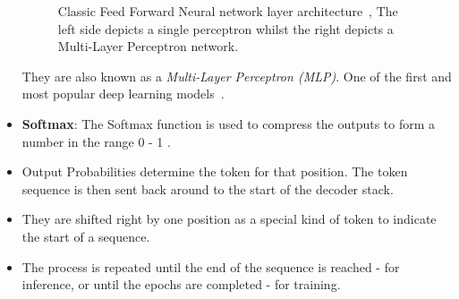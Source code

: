 \begin{itemize}
\begin{figure}[H]
		      \label{fig:feed_forward}
		      \caption{Classic Feed Forward Neural network layer architecture~\autocite{guptaDeepLearningFeedforward2018}, The left side depicts
			      a single perceptron whilst the right depicts a Multi-Layer Perceptron network.}
	      \end{figure}
	      They are also known as a \emph{Multi-Layer Perceptron (MLP)}. One of the first and most popular deep learning models~\autocite{FeedforwardNeuralNetwork2022}.
	\item \textbf{Softmax}: The Softmax function is used to compress the outputs to form a number in the range 0 - 1 .
	\item Output Probabilities determine the token for that position. The token sequence is then sent back around to the start of the decoder stack.
	\item They are shifted right by one position as a special kind of token to indicate the start of a sequence.
	\item The process is repeated until the end of the sequence is reached - for inference, or until the epochs are completed - for training.
\end{itemize}

